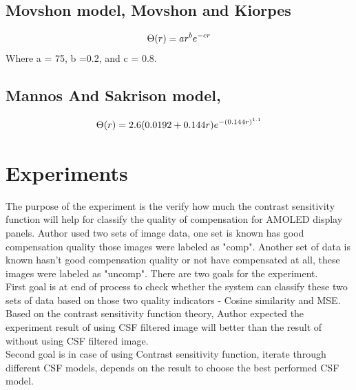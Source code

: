 \documentclass{article}
\begin{document}
\subsection{Movshon model, Movshon and Kiorpes\cite{Movshon-Kiorpes}}
\begin{equation}
    \centering
    \label{eq:mannos}
     \Theta(r) = ar^be^{-cr}
\end{equation}
Where a = 75, b =0.2, and c = 0.8. 
\subsection{Mannos And Sakrison model,\cite{Mannos-Sakrison}}
\begin{equation}
    \centering
    \label{eq:mannos}
     \Theta(r) = 2.6(0.0192+0.144r)e^{-(0.144r)^{1.1}}
\end{equation}

\section{Experiments}
The purpose of the experiment is the verify how much the contrast sensitivity function will help for classify the quality of compensation for AMOLED display panels. Author used two sets of image data, one set is known has good compensation quality those images were labeled as "comp". Another set of data is known hasn't good compensation quality or not have compensated at all, these images were labeled as "uncomp". There are two goals for the experiment.\\
First goal is at end of process to check whether the system can classify these two sets of data based on those two quality indicators - Cosine similarity and MSE. Based on the contrast sensitivity function theory, Author expected the experiment result of using CSF filtered image will better than the result of without using CSF filtered image.\\
Second goal is in case of using Contrast sensitivity function, iterate through different CSF models, depends on the result to choose the best performed CSF model.
\end{document}
